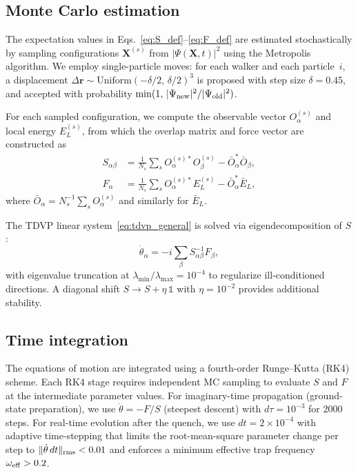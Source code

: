 \documentclass[twocolumn,superscriptaddress,aps,pra,longbibliography]{revtex4-2}
\newcommand{\bx}{\mathbf{X}}
\newcommand{\br}{\mathbf{r}}
\begin{document}
\subsection{Monte Carlo estimation}
\label{sec:mc}

The expectation values in Eqs.~\eqref{eq:S_def}--\eqref{eq:F_def} are
estimated stochastically by sampling configurations $\bx^{(s)}$ from
$|\Psi(\bx,t)|^2$ using the Metropolis algorithm.
We employ single-particle moves: for each walker and each particle~$i$,
a displacement $\Delta\br \sim \text{Uniform}(-\delta/2,\,\delta/2)^3$
is proposed with step size $\delta=0.45$, and accepted with probability
$\min(1,\,|\Psi_{\rm new}|^2/|\Psi_{\rm old}|^2)$.

For each sampled configuration, we compute the observable vector
$O_\alpha^{(s)}$ and local energy $E_L^{(s)}$, from which the overlap
matrix and force vector are constructed as
\begin{align}
S_{\alpha\beta} &= \frac{1}{N_s}\sum_s O_\alpha^{(s)*}O_\beta^{(s)}
- \bar{O}_\alpha^*\bar{O}_\beta,
\\
F_\alpha &= \frac{1}{N_s}\sum_s O_\alpha^{(s)*}E_L^{(s)}
- \bar{O}_\alpha^*\bar{E}_L,
\end{align}
where $\bar{O}_\alpha = N_s^{-1}\sum_s O_\alpha^{(s)}$ and similarly for
$\bar{E}_L$.

The TDVP linear system~\eqref{eq:tdvp_general} is solved via
eigendecomposition of $S$:
\begin{equation}
\dot\theta_\alpha = -i\sum_\beta S^{-1}_{\alpha\beta}F_\beta,
\end{equation}
with eigenvalue truncation at $\lambda_{\min}/\lambda_{\max} = 10^{-4}$
to regularize ill-conditioned directions.  A diagonal shift
$S \to S + \eta\,\mathbb{1}$ with $\eta = 10^{-2}$ provides additional
stability.

\subsection{Time integration}

The equations of motion are integrated using a fourth-order Runge--Kutta
(RK4) scheme.  Each RK4 stage requires independent MC sampling to
evaluate $S$ and $F$ at the intermediate parameter values.
For imaginary-time propagation (ground-state preparation), we use
$\dot\theta = -F/S$ (steepest descent) with $d\tau = 10^{-3}$ for
2000 steps.  For real-time evolution after the quench, we use
$dt = 2\times10^{-4}$ with adaptive time-stepping that limits the
root-mean-square parameter change per step to
$\|\dot\theta\,dt\|_{\rm rms} < 0.01$ and enforces a minimum
effective trap frequency $\omega_{\rm eff} > 0.2$.
\end{document}
